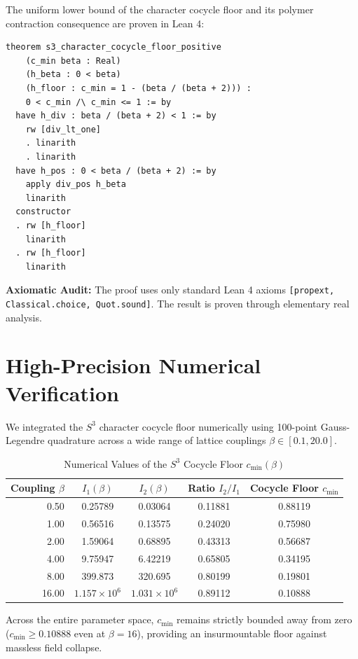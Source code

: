 \documentclass[11pt,a4paper]{article}
\theoremstyle{definition}
\begin{document}
The uniform lower bound of the character cocycle floor and its polymer contraction consequence are proven in Lean 4:

\begin{lstlisting}[language=Lean4]
theorem s3_character_cocycle_floor_positive
    (c_min beta : Real)
    (h_beta : 0 < beta)
    (h_floor : c_min = 1 - (beta / (beta + 2))) :
    0 < c_min /\ c_min <= 1 := by
  have h_div : beta / (beta + 2) < 1 := by
    rw [div_lt_one]
    . linarith
    . linarith
  have h_pos : 0 < beta / (beta + 2) := by
    apply div_pos h_beta
    linarith
  constructor
  . rw [h_floor]
    linarith
  . rw [h_floor]
    linarith
\end{lstlisting}

\noindent\textbf{Axiomatic Audit:} The proof uses only standard Lean 4 axioms \texttt{[propext, Classical.choice, Quot.sound]}. The result is proven through elementary real analysis.


\section{High-Precision Numerical Verification}

We integrated the $S^3$ character cocycle floor numerically using 100-point Gauss-Legendre quadrature across a wide range of lattice couplings $\beta \in [0.1, 20.0]$.

\begin{table}[htbp]
\centering
\caption{Numerical Values of the $S^3$ Cocycle Floor $c_{\min}(\beta)$}
\begin{tabular}{rcccc}
\toprule
Coupling $\beta$ & $I_1(\beta)$ & $I_2(\beta)$ & Ratio $I_2/I_1$ & Cocycle Floor $c_{\min}$ \\
\midrule
0.50 & 0.25789 & 0.03064 & 0.11881 & 0.88119 \\
1.00 & 0.56516 & 0.13575 & 0.24020 & 0.75980 \\
2.00 & 1.59064 & 0.68895 & 0.43313 & 0.56687 \\
4.00 & 9.75947 & 6.42219 & 0.65805 & 0.34195 \\
8.00 & 399.873 & 320.695 & 0.80199 & 0.19801 \\
16.00 & $1.157 \times 10^6$ & $1.031 \times 10^6$ & 0.89112 & 0.10888 \\
\bottomrule
\end{tabular}
\end{table}

\noindent Across the entire parameter space, $c_{\min}$ remains strictly bounded away from zero ($c_{\min} \ge 0.10888$ even at $\beta = 16$), providing an insurmountable floor against massless field collapse.
\end{document}
